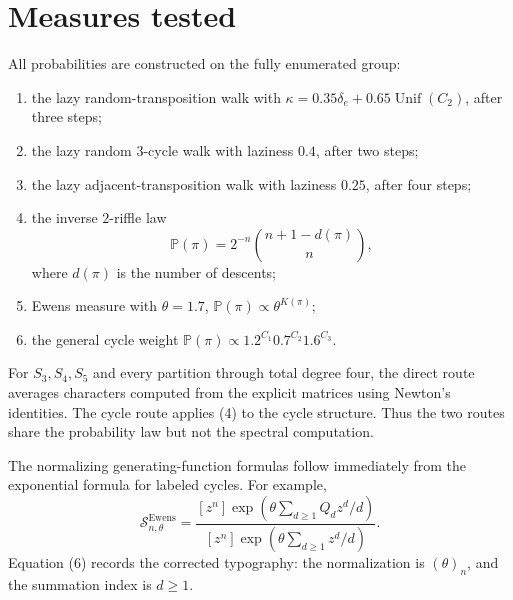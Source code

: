 \documentclass[11pt]{article}
\newcommand{\Sfun}{\mathcal S}
\begin{document}
\section{Measures tested}
All probabilities are constructed on the fully enumerated group:
\begin{enumerate}[leftmargin=*,itemsep=3pt]
\item the lazy random-transposition walk with
$\kappa=0.35\delta_e+0.65\operatorname{Unif}(C_2)$, after three steps;
\item the lazy random $3$-cycle walk with laziness $0.4$, after two steps;
\item the lazy adjacent-transposition walk with laziness $0.25$, after four steps;
\item the inverse $2$-riffle law
\begin{equation}
\mathbb P(\pi)=2^{-n}\binom{n+1-d(\pi)}{n},                \tag{5}
\end{equation}
where $d(\pi)$ is the number of descents;
\item Ewens measure with $\theta=1.7$,
$\mathbb P(\pi)\propto\theta^{K(\pi)}$;
\item the general cycle weight
$\mathbb P(\pi)\propto1.2^{C_1}0.7^{C_2}1.6^{C_3}$.
\end{enumerate}
For $S_3,S_4,S_5$ and every partition through total degree four, the direct
route averages characters computed from the explicit matrices using Newton's
identities.  The cycle route applies (4) to the cycle structure.  Thus the two
routes share the probability law but not the spectral computation.

The normalizing generating-function formulas follow immediately from the
exponential formula for labeled cycles.  For example,
\begin{equation}
\Sfun_{n,\theta}^{\mathrm{Ewens}}=
\frac{[z^n]\exp\!\left(\theta\sum_{d\geq1}Q_dz^d/d\right)}
{[z^n]\exp\!\left(\theta\sum_{d\geq1}z^d/d\right)}.        \tag{6}
\end{equation}
Equation (6) records the corrected typography: the normalization is
$(\theta)_n$, and the summation index is $d\geq1$.
\end{document}
